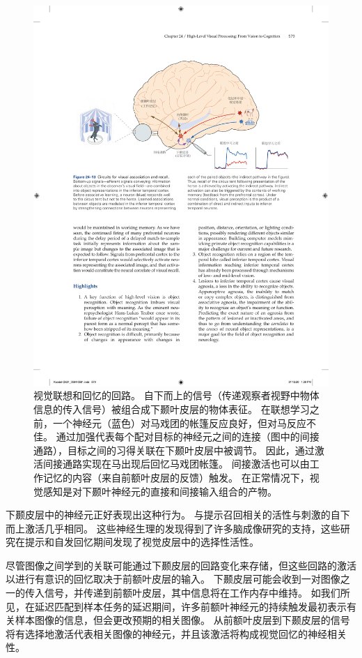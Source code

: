\begin{figure}[htbp]
	\centering
	\includegraphics[width=1.0\linewidth]{chap24/fig_24_13}
	\caption{视觉联想和回忆的回路。
		自下而上的信号（传递观察者视野中物体信息的传入信号）被组合成下颞叶皮层的物体表征。
		在联想学习之前，一个神经元（蓝色）对马戏团的帐篷反应良好，但对马反应不佳。
		通过加强代表每个配对目标的神经元之间的连接（图中的间接通路），目标之间的习得关联在下颞叶皮层中被调节。
		因此，通过激活间接通路实现在马出现后回忆马戏团帐篷。
		间接激活也可以由工作记忆的内容（来自前额叶皮层的反馈）触发。
		在正常情况下，视觉感知是对下颞叶神经元的直接和间接输入组合的产物。}
	\label{fig:24_13}
\end{figure}


下颞皮层中的神经元正好表现出这种行为。
与提示召回相关的活性与刺激的自下而上激活几乎相同。 
这些神经生理的发现得到了许多脑成像研究的支持，这些研究在提示和自发回忆期间发现了视觉皮层中的选择性活性。


尽管图像之间学到的关联可能通过下颞皮层的回路变化来存储，但这些回路的激活以进行有意识的回忆取决于前额叶皮层的输入。
下颞皮层可能会收到一对图像之一的传入信号，并传递到前额叶皮层，其中信息将在工作内存中维持。
如我们所见，在延迟匹配到样本任务的延迟期间，许多前额叶神经元的持续触发最初表示有关样本图像的信息，但会更改预期的相关图像。
从前额叶皮层到下颞皮层的信号将有选择地激活代表相关图像的神经元，并且该激活将构成视觉回忆的神经相关性。



